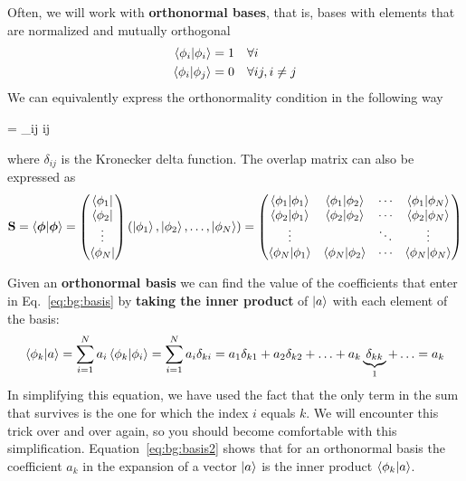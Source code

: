 \documentclass[../Main/chem532-notes.tex]{subfiles}
\begin{document}
Often, we will work with \textbf{orthonormal bases}, that is, bases with elements that are normalized and mutually orthogonal
\begin{equation}
\begin{split}
\braket{\phi_i | \phi_i} &= 1 \quad \forall i \\
\braket{\phi_i | \phi_j} &= 0 \quad \forall ij, i \neq j
\end{split}
\end{equation}
We can equivalently express the orthonormality condition in the following way
\begin{iequation}
 = \delta_{ij} \quad \forall ij
\end{iequation}
where $\delta_{ij}$ is the Kronecker delta function.
The overlap matrix can also be expressed as
\begin{equation}
\mathbf{S} = \braket{\boldsymbol \phi | \boldsymbol \phi }
= 
\begin{pmatrix}
\bra{\phi_1} \\
\bra{\phi_2} \\
\vdots \\
\bra{\phi_N}
\end{pmatrix}
 (\ket{\phi_1}, \ket{\phi_2}, \ldots, \ket{\phi_N})
 =
 \begin{pmatrix}
\braket{\phi_1 | \phi_1} & \braket{\phi_1 | \phi_2} & \cdots & \braket{\phi_1 | \phi_N}  \\
\braket{\phi_2 | \phi_1} & \braket{\phi_2 | \phi_2} & \cdots & \braket{\phi_2 | \phi_N}  \\
\vdots & & \ddots& \vdots \\
\braket{\phi_N | \phi_1} & \braket{\phi_N| \phi_2} & \cdots & \braket{\phi_N | \phi_N}
\end{pmatrix}
\end{equation}



Given an \textbf{orthonormal basis} we can find the value of the coefficients that enter in Eq.~\eqref{eq:bg:basis} by \textbf{taking the inner product} of $\ket{a}$ with each element of the basis:
\begin{equation}
\label{eq:bg:basis2}
\braket{\phi_k | a} = \sum_{i = 1}^N a_i \braket{\phi_k |\phi_i} = \sum_{i = 1}^N a_i  \delta_{ki} = 
a_1 \delta_{k1} + a_2 \delta_{k2} + \ldots + a_k \underbrace{\delta_{kk}}_{1} + \ldots = a_k 
\end{equation}
In simplifying this equation, we have used the fact that the only term in the sum that survives is the one for which the index $i$ equals $k$.
We will encounter this trick over and over again, so you should become comfortable with this simplification.
Equation~\eqref{eq:bg:basis2} shows that for an orthonormal basis the coefficient $a_k$ in the expansion of a vector $\ket{a}$ is the inner product $\braket{\phi_k | a}$.
\end{document}
